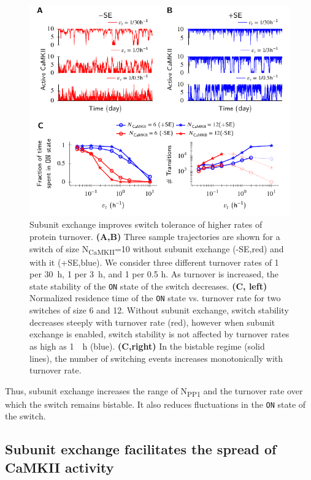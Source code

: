 \documentclass[9pt,lineno,doublespacing]{elife}
\newcommand\SUB[2]{#1\textsubscript{#2}}
\begin{document}
\begin{figure}[th!]
    \includegraphics[width=114mm]{./PaperFigures/elifeFigure3/figure_turnover_tolerance_114.pdf}
    \caption{Subunit exchange improves switch tolerance of higher rates of
        protein turnover.
        \textbf{(A,B)} Three sample trajectories are shown for a switch of 
        size \SUB{N}{CaMKII}=10 without subunit exchange
        (-SE,red) and with it (+SE,blue). We consider three different 
        turnover rates of 1 per \SI{30}{\hour}, 1 per \SI{3}{\hour}, 
        and 1 per 0.5 \si{\hour}. As turnover is increased, the state stability 
        of the \texttt{ON} state of the switch decreases.
        \textbf{(C, left)} Normalized residence time of the \texttt{ON} state vs. turnover
        rate for two switches of size 6 and 12. Without subunit exchange, switch
        stability decreases steeply with turnover rate (red), however when
        subunit exchange is enabled, switch stability is not affected by
        turnover rates as high as \SI{1}{\per \hour} (blue). \textbf{(C,right)} In
        the bistable regime (solid lines), the number of switching events
        increases monotonically with turnover rate.
    }\label{fig:turnover}
\end{figure}

Thus, subunit exchange increases the range of \SUB{N}{PP1} and the turnover rate
over which the switch remains bistable. It also reduces fluctuations in the
 \texttt{ON} state of the switch.

\subsection{Subunit exchange facilitates the spread of CaMKII activity}
\label{res:spread_activity}
\end{document}
